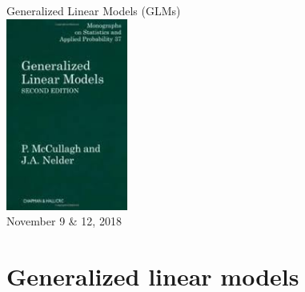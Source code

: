 \documentclass[color=usenames,dvipsnames]{beamer}\usepackage[]{graphicx}\usepackage[]{color}
\begin{document}
\begin{frame}[plain]
  \huge
  \begin{center}
    \textcolor{NavyBlue}{Generalized Linear Models (GLMs)} \\
    \vfill
    \includegraphics[width=0.3\textwidth]{McCullagh-Nelder} \\
    \large \vfill
    November 9 \& 12, 2018
  \end{center}
\end{frame}



\section{Generalized linear models}
\end{document}
